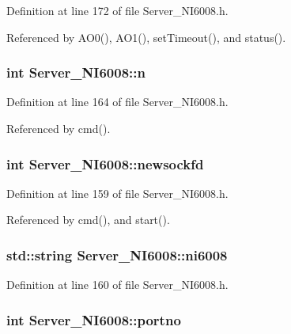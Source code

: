 Definition at line 172 of file Server\_\-NI6008.h.

Referenced by AO0(), AO1(), setTimeout(), and status().\hypertarget{classServer__NI6008_a5573d5feeef8372e2b31a54d6a5a19aa}{
\subsubsection[{n}]{\setlength{\rightskip}{0pt plus 5cm}int {\bf Server\_\-NI6008::n}}}
\label{classServer__NI6008_a5573d5feeef8372e2b31a54d6a5a19aa}


Definition at line 164 of file Server\_\-NI6008.h.

Referenced by cmd().\hypertarget{classServer__NI6008_a37e3d77925f6c6c9d7dee4dc1c8560d6}{
\subsubsection[{newsockfd}]{\setlength{\rightskip}{0pt plus 5cm}int {\bf Server\_\-NI6008::newsockfd}}}
\label{classServer__NI6008_a37e3d77925f6c6c9d7dee4dc1c8560d6}


Definition at line 159 of file Server\_\-NI6008.h.

Referenced by cmd(), and start().\hypertarget{classServer__NI6008_a9c73f187e64f7d753a8eabd9d1b6e9cd}{
\subsubsection[{ni6008}]{\setlength{\rightskip}{0pt plus 5cm}std::string {\bf Server\_\-NI6008::ni6008}}}
\label{classServer__NI6008_a9c73f187e64f7d753a8eabd9d1b6e9cd}


Definition at line 160 of file Server\_\-NI6008.h.\hypertarget{classServer__NI6008_ae70c386215b3945d98eba610022db813}{
\subsubsection[{portno}]{\setlength{\rightskip}{0pt plus 5cm}int {\bf Server\_\-NI6008::portno}}}
\label{classServer__NI6008_ae70c386215b3945d98eba610022db813}


